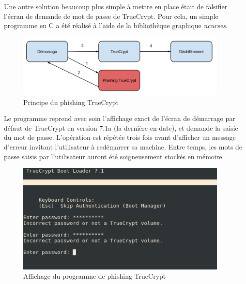 \documentclass[12pt,a4paper]{article}
\begin{document}
Une autre solution beaucoup plus simple à mettre en place était de falsifier l'écran de demande de mot de passe de TrueCrypt. Pour cela, un simple programme en C a été réalisé à l'aide de la bibliothèque graphique \textit{ncurses}.

\begin{figure}[H]
	\centering
	\includegraphics[width=400px]{img/truecrypt_phishing.png}
	\caption{Principe du phishing TrueCrypt}
\end{figure}

Le programme reprend avec soin l'affichage exact de l'écran de démarrage par défaut de TrueCrypt en version 7.1a (la dernière en date), et demande la saisie du mot de passe. L'opération est répétée trois fois avant d'afficher un message d'erreur invitant l'utilisateur à redémarrer sa machine. Entre temps, les mots de passe saisis par l'utilisateur auront été soigneusement stockés en mémoire.

\begin{figure}[H]
        
	\centering
	\includegraphics[width=400px]{img/truecrypt_ncurses.png}
	\caption{Affichage du programme de phishing TrueCrypt}
\end{figure}
\end{document}
